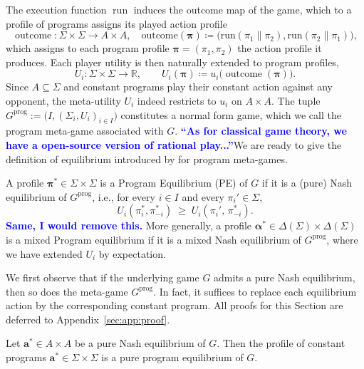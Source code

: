 \documentclass[twoside,11pt]{article}
\newcommand{\boldblue}[1]{\textbf{\textcolor{blue}{#1}}}
\begin{document}
The execution function $\operatorname{run}$ induces the outcome map of the game, which to a profile of programs assigns its played action profile
\begin{equation*}
    \operatorname{outcome}:\Sigma \times \Sigma \to A \times A, \quad \mathrm{outcome}(\bm{\pi}) \coloneq \biggl(\mathrm{run}(\pi_1 \| \pi_2), \mathrm{run}(\pi_2 \|\pi_1)\biggr),
\end{equation*}
which assigns to each program profile $\bm{\pi} = (\pi_1, \pi_2)$ the action profile it produces. Each player utility is then naturally extended to program profiles, 
\begin{equation*}
    U_i: \Sigma \times \Sigma \to \mathbb{R},
\qquad
U_i(\bm{\pi}) \coloneq u_i\bigl(\operatorname{outcome}(\bm{\pi})\bigr).
\end{equation*}
Since $A \subseteq \Sigma$ and constant programs play their constant action against any opponent, the meta-utility $U_i$ indeed restricts to $u_i$ on $A \times A$. The tuple $G^{\mathrm{prog}} := \bigl(I, (\Sigma_i, U_i)_{i \in I}\bigr)$ constitutes a normal form game, which we call the program meta-game associated with $G$. \boldblue{\enquote{As for classical game theory, we have a open-source version of rational play...}}We are ready to give the definition of equilibrium introduced by \cite{tennenholtz2004program} for program meta-games.

\begin{definition}\label{def:PE}
A profile $\bm{\pi}^{*} \in \Sigma \times \Sigma$ is a Program Equilibrium (PE) of $G$ if it is a (pure) Nash equilibrium of $G^{\mathrm{prog}}$, i.e., for every $i \in I$ and every $\pi_i' \in \Sigma$,
\[
U_i(\pi_i^{*}, \pi_{-i}^*) \;\ge\; U_i(\pi_i',\, \pi^{*}_{-i}).
\]
\boldblue{Same, I would remove this.} More generally, a profile $\bm{\alpha}^* \in  \Delta(\Sigma) \times \Delta(\Sigma)$ is a mixed Program equilibrium if it is a mixed Nash equilibrium of $G^{\mathrm{prog}}$, where we have extended $U_i$ by expectation.
\end{definition}

We first observe that if the underlying game $G$ admits a pure Nash equilibrium, then so does the meta-game $G^{\mathrm{prog}}$. In fact, it suffices to replace each equilibrium action by the corresponding constant program. All proofs for this Section are deferred to Appendix~\ref{sec:app:proof}.

\begin{theorem}\label{th:NE-is-PE}
Let $\bm{a}^* \in A \times A$ be a pure Nash equilibrium of $G$. Then the profile of constant programs $\bm{a}^* \in \Sigma \times \Sigma$ is a pure  program equilibrium of $G$.
\end{theorem}
\end{document}
